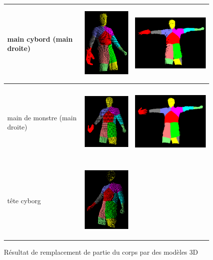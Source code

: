 \begin{figure}[!ht]
\begin{center}
\begin{tabular}{C{2cm}|c|c}
      main cybord (main droite) & \includegraphics[height=4cm]{image/cyborgHand1.PNG} & \includegraphics[height=4cm]{image/cyborgHand2.PNG} \\
      \hline
      main de monstre (main droite) & \includegraphics[height=4cm]{image/monsterHand1.PNG} & \includegraphics[height=4cm]{image/monsterHand2.PNG} \\
      \hline
      tête cyborg & \includegraphics[height=4cm]{image/cyborgHead.PNG} &  \\
      \hline
    \end{tabular}
    \caption{Résultat de remplacement de partie du corps par des modèles 3D}
    \label{tab:modelMatching}
  \end{center}
\end{figure}

